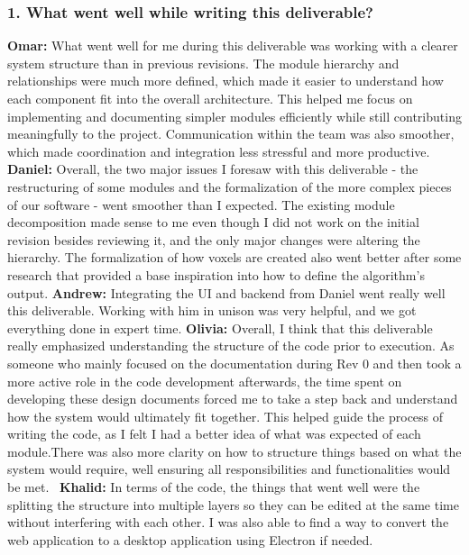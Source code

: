 \documentclass[12pt, titlepage]{article}
\begin{document}
\subsubsection*{1. What went well while writing this deliverable?}
\bigskip\bigskip
\textbf{Omar: } What went well for me during this deliverable was working with a clearer system structure than in previous revisions. The module hierarchy and relationships were much more defined, which made it easier to understand how each component fit into the overall architecture. This helped me focus on implementing and documenting simpler modules efficiently while still contributing meaningfully to the project. Communication within the team was also smoother, which made coordination and integration less stressful and more productive.
\newline
\newline
\textbf{Daniel: } Overall, the two major issues I foresaw with this deliverable - the restructuring of some modules and the formalization of the more complex pieces of our software - went smoother than I expected. The existing module decomposition made sense to me even though I did not work on the initial revision besides reviewing it, and the only major changes were altering the hierarchy. The formalization of how voxels are created also went better after some research that provided a base inspiration into how to define the algorithm's output.
\newline
\newline
\textbf{Andrew: } Integrating the UI and backend from Daniel went really well this deliverable. Working with him in unison was very helpful, and we got everything done in expert time.
\newline
\newline
\textbf{Olivia: } Overall, I think that this deliverable really emphasized understanding the structure of the code prior to execution. As someone who mainly focused on the documentation during Rev 0 and then took a more active role in the code development afterwards, the time spent on developing these design documents forced me to take a step back and understand how the system would ultimately fit together. This helped guide the process of writing the code, as I felt I had a better idea of what was expected of each module.There was also more clarity on how to structure things based on what the system would require, well ensuring all responsibilities and functionalities would be met. 
\newline
\newline
\textbf{Khalid: } In terms of the code, the things that went well were the splitting the structure into multiple layers so they can be edited at the same time without interfering with each other. I was also able to find a way to convert the web application to a desktop application using Electron if needed.
\end{document}

